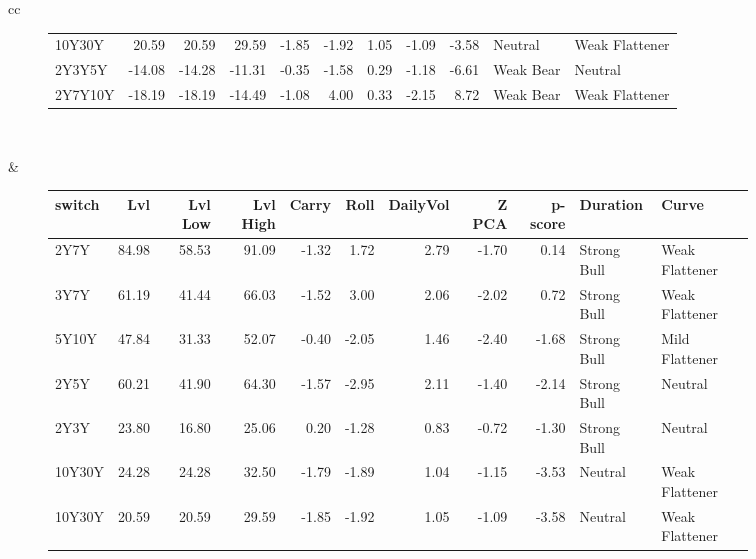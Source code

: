 \documentclass[a4paper,oneside]{report}
\begin{document}
\begin{figure}[htbp]
\begin{tabular}[c]{cc}
\begin{subfigure}[c]{0.5\textwidth}
\begin{adjustbox}{max width=\textwidth}
\begin{tabular}{lrrrrrrrrll}
    10Y30Y &   20.59 &    20.59 &     29.59 &  -1.85 & -1.92 &      1.05 &  -1.09 &    -3.58 &      Neutral &  Weak Flattener \\
    2Y3Y5Y &  -14.08 &   -14.28 &    -11.31 &  -0.35 & -1.58 &      0.29 &  -1.18 &    -6.61 &    Weak Bear &         Neutral \\
   2Y7Y10Y &  -18.19 &   -18.19 &    -14.49 &  -1.08 &  4.00 &      0.33 &  -2.15 &     8.72 &    Weak Bear &  Weak Flattener \\
\hline
\end{tabular}
\end{adjustbox}
\end{subfigure}\\
 
 

\begin{subfigure}[c]{0.5\textwidth}
 
 \null\hfill
 \end{subfigure}&
 
\begin{subfigure}[c]{0.5\textwidth}
\begin{adjustbox}{max width=\textwidth}
\begin{tabular}{lrrrrrrrrll}
\hline
 switch &    Lvl &  Lvl Low &  Lvl High &  Carry &  Roll &  DailyVol &  Z PCA &  p-score &     Duration &           Curve \\
\hline
   2Y7Y &  84.98 &    58.53 &     91.09 &  -1.32 &  1.72 &      2.79 &  -1.70 &     0.14 &  Strong Bull &  Weak Flattener \\
   3Y7Y &  61.19 &    41.44 &     66.03 &  -1.52 &  3.00 &      2.06 &  -2.02 &     0.72 &  Strong Bull &  Weak Flattener \\
  5Y10Y &  47.84 &    31.33 &     52.07 &  -0.40 & -2.05 &      1.46 &  -2.40 &    -1.68 &  Strong Bull &  Mild Flattener \\
   2Y5Y &  60.21 &    41.90 &     64.30 &  -1.57 & -2.95 &      2.11 &  -1.40 &    -2.14 &  Strong Bull &         Neutral \\
   2Y3Y &  23.80 &    16.80 &     25.06 &   0.20 & -1.28 &      0.83 &  -0.72 &    -1.30 &  Strong Bull &         Neutral \\
 10Y30Y &  24.28 &    24.28 &     32.50 &  -1.79 & -1.89 &      1.04 &  -1.15 &    -3.53 &      Neutral &  Weak Flattener \\
 10Y30Y &  20.59 &    20.59 &     29.59 &  -1.85 & -1.92 &      1.05 &  -1.09 &    -3.58 &      Neutral &  Weak Flattener \\
\hline
\end{tabular}
\end{adjustbox}
 \end{subfigure}\\
 

\end{tabular}
\end{figure}
\end{document}
